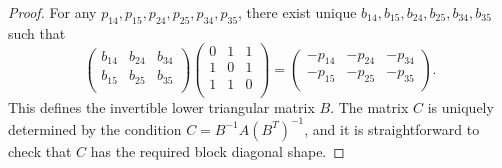 \documentclass{amsart}
\theoremstyle{definition}
\theoremstyle{remark}
\begin{document}
\begin{proof}
For any $p_{14}, p_{15}, p_{24}, p_{25}, p_{34}, p_{35}$, there exist unique  $b_{14}, b_{15}, b_{24}, b_{25}, b_{34}, b_{35}$ such that
\[
\begin{pmatrix}
b_{14} & b_{24} & b_{34}\\
b_{15} & b_{25} & b_{35}\\
\end{pmatrix}
\begin{pmatrix}
0 & 1 & 1 \\
1 & 0 & 1 \\
1 & 1 & 0 \\
\end{pmatrix}
=\begin{pmatrix}
-p_{14} & -p_{24} & -p_{34} \\
-p_{15} & -p_{25} & -p_{35} \\
\end{pmatrix}.
\]
This defines the invertible lower triangular matrix $B$.
The matrix $C$ is uniquely determined by the condition $C=B^{-1}A(B^{T})^{-1}$, and it is straightforward to check that $C$ has the required block diagonal shape.

\end{proof}
\end{document}
